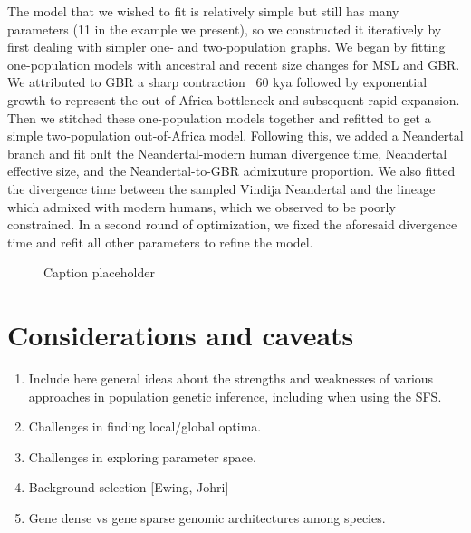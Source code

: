 \documentclass[]{article}
\begin{document}
The model that we wished to fit is relatively simple but still has many parameters (11 in the example we present), so we constructed it iteratively by first dealing with simpler one- and two-population graphs.
We began by fitting one-population models with ancestral and recent size changes for MSL and GBR.
We attributed to GBR a sharp contraction ~60 kya followed by exponential growth to represent the out-of-Africa bottleneck and subsequent rapid expansion.
Then we stitched these one-population models together and refitted to get a simple two-population out-of-Africa model. 
Following this, we added a Neandertal branch and fit onlt the Neandertal-modern human divergence time, Neandertal effective size, and the Neandertal-to-GBR admixuture proportion. 
We also fitted the divergence time between the sampled Vindija Neandertal and the lineage which admixed with modern humans, which we observed to be poorly constrained.
In a second round of optimization, we fixed the aforesaid divergence time and refit all other parameters to refine the model.


\begin{figure}[t!]
    \caption{Caption placeholder}
    \label{fig:humans}
\end{figure}


\section*{Considerations and caveats}\label{sec:conclusions}

\begin{enumerate}
    \item Include here general ideas about the strengths and weaknesses of
        various approaches in population genetic inference, including when
        using the SFS.
    \item Challenges in finding local/global optima.
    \item Challenges in exploring parameter space.
    \item Background selection [Ewing, Johri]
    \item Gene dense vs gene sparse genomic architectures among species.
\end{enumerate}



\end{document}
